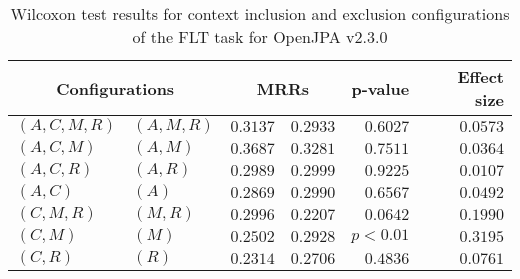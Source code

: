 
\begin{table}
\begin{spacing}{1.2}
\centering
\caption{Wilcoxon test results for context inclusion and exclusion configurations of the FLT task for OpenJPA v2.3.0}
\label{table:versus-wilcox-openjpa-flt-context}
\begin{tabular}{ll|rr|rr}
\toprule
      \multicolumn{2}{c|}{Configurations} &          \multicolumn{2}{c|}{MRRs} &       p-value & Effect size \\
\midrule
 $(A,C,M,R)$ &  $(A,M,R)$ & $0.3137$ & $0.2933$ & $0.6027$ &    $0.0573$ \\
   $(A,C,M)$ &    $(A,M)$ & $0.3687$ & $0.3281$ & $0.7511$ &    $0.0364$ \\
   $(A,C,R)$ &    $(A,R)$ & $0.2989$ & $0.2999$ & $0.9225$ &    $0.0107$ \\
     $(A,C)$ &      $(A)$ & $0.2869$ & $0.2990$ & $0.6567$ &    $0.0492$ \\
   $(C,M,R)$ &    $(M,R)$ & $0.2996$ & $0.2207$ & $0.0642$ &    $0.1990$ \\
     $(C,M)$ &      $(M)$ & $0.2502$ & $0.2928$ & $p<0.01$ &    $0.3195$ \\
     $(C,R)$ &      $(R)$ & $0.2314$ & $0.2706$ & $0.4836$ &    $0.0761$ \\
\bottomrule
\end{tabular}

\end{spacing}
\end{table}

